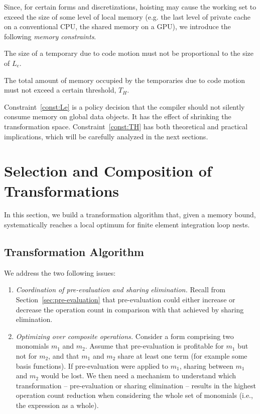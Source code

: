 Since, for certain forms and discretizations, hoisting may cause the working set to exceed the size of some level of local memory (e.g. the last level of private cache on a conventional CPU, the shared memory on a GPU), we introduce the following \textit{memory constraints}.

\begin{Const}
\label{const:Le}
The size of a temporary due to code motion must not be proportional to the size of $L_e$.
\end{Const}

\begin{Const}
\label{const:TH}
The total amount of memory occupied by the temporaries due to code motion must not exceed a certain threshold, \texttt{$T_H$}.
\end{Const}

Constraint~\ref{const:Le} is a policy decision that the compiler should not silently consume memory on global data objects. It has the effect of shrinking the transformation space. Constraint~\ref{const:TH} has both theoretical and practical implications, which will be carefully analyzed in the next sections.




\section{Selection and Composition of Transformations}
\label{sec:optimal-synthesis}
In this section, we build a transformation algorithm that, given a memory bound, systematically reaches a local optimum for finite element integration loop nests. 

\subsection{Transformation Algorithm}
We address the two following issues: 
\begin{enumerate}
\item \textit{Coordination of pre-evaluation and sharing elimination.} Recall from Section~\ref{sec:pre-evaluation} that pre-evaluation could either increase or decrease the operation count in comparison with that achieved by sharing elimination.
\item \textit{Optimizing over composite operations.} Consider a form comprising two monomials $m_1$ and $m_2$. Assume that pre-evaluation is profitable for $m_1$ but not for $m_2$, and that $m_1$ and $m_2$ share at least one term (for example some basis functions). If pre-evaluation were applied to $m_1$, sharing between $m_1$ and $m_2$ would be lost. We then need a mechanism to understand which transformation -- pre-evaluation or sharing elimination -- results in the highest operation count reduction when considering the whole set of monomials (i.e., the expression as a whole).
\end{enumerate}

